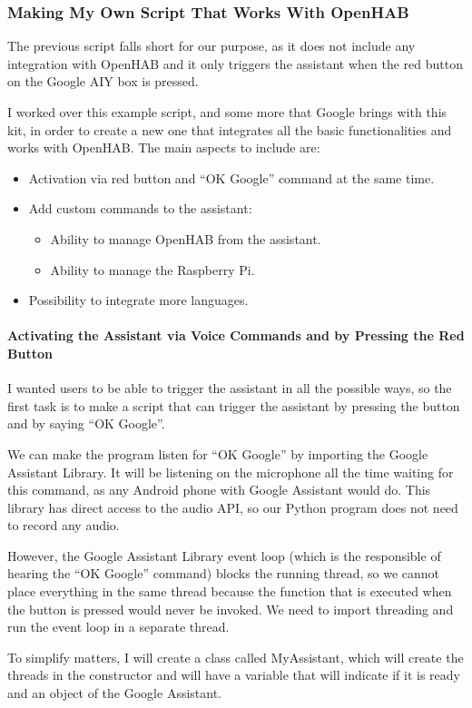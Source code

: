 \subsubsection{Making My Own Script That Works With OpenHAB}
The previous script falls short for our purpose, as it does not include any integration with OpenHAB and it only triggers the 
assistant when the red button on the Google AIY box is pressed.

I worked over this example script, and some more that Google brings with this kit, in order to create a new one that integrates 
all the basic functionalities and works with OpenHAB. The main aspects to include are:
\begin{itemize}
	\item Activation via red button and “OK Google” command at the same time.
	\item Add custom commands to the assistant:
	\begin{itemize}
		\item Ability to manage OpenHAB from the assistant.
		\item Ability to manage the Raspberry Pi.
	\end{itemize}
	\item Possibility to integrate more languages.
\end{itemize}

\paragraph{Activating the Assistant via Voice Commands and by Pressing the Red Button}
I wanted users to be able to trigger the assistant in all the possible ways, so the first task is to make a script that can trigger 
the assistant by pressing the button and by saying “OK Google”.

We can make the program listen for “OK Google” by importing the Google Assistant Library. It will be listening on the microphone 
all the time waiting for this command, as any Android phone with Google Assistant would do. This library has direct access to the 
audio API, so our Python program does not need to record any audio.

However, the Google Assistant Library event loop (which is the responsible of hearing the “OK Google” command) blocks the running 
thread, so we cannot place everything in the same thread because the function that is executed when the button is pressed would 
never be invoked. We need to import threading and run the event loop in a separate thread.

To simplify matters, I will create a class called MyAssistant, which will create the threads in the constructor and will have a 
variable that will indicate if it is ready and an object of the Google Assistant.